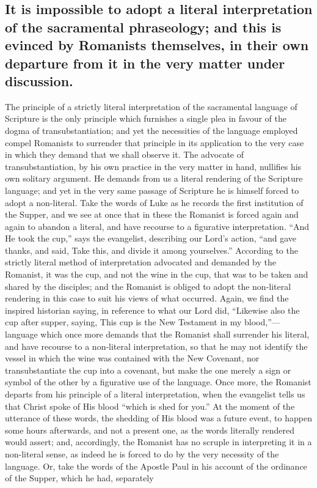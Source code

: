 \documentclass[]{book}
\begin{document}
\hypertarget{it-is-impossible-to-adopt-a-literal-interpretation-of-the-sacramental-phraseology-and-this-is-evinced-by-romanists-themselves-in-their-own-departure-from-it-in-the-very-matter-under-discussion.}{%
\subsection{It is impossible to adopt a literal interpretation of the sacramental phraseology; and this is evinced by Romanists themselves, in their own departure from it in the very matter under discussion.}\label{it-is-impossible-to-adopt-a-literal-interpretation-of-the-sacramental-phraseology-and-this-is-evinced-by-romanists-themselves-in-their-own-departure-from-it-in-the-very-matter-under-discussion.}}

The principle of a strictly literal interpretation of the sacramental language of Scripture is the only principle which furnishes a single plea in favour of the dogma of transubstantiation; and yet the necessities of the language employed compel Romanists to surrender that principle in its application to the very case in which they demand that we shall observe it. The advocate of transubstantiation, by his own practice in the very matter in hand, nullifies his own solitary argument. He demands from us a literal rendering of the Scripture language; and yet in the very same passage of Scripture he is himself forced to adopt a non-literal. Take the words of Luke as he records the first institution of the Supper, and we see at once that in these the Romanist is forced again and again to abandon a literal, and have recourse to a figurative interpretation. ``And He took the cup,'' says the evangelist, describing our Lord's action, ``and gave thanks, and said, Take this, and divide it among yourselves.'' According to the strictly literal method of interpretation advocated and demanded by the Romanist, it was the cup, and not the wine in the cup, that was to be taken and shared by the disciples; and the Romanist is obliged to adopt the non-literal rendering in this case to suit his views of what occurred. Again, we find the inspired historian saying, in reference to what our Lord did, ``Likewise also the cup after supper, saying, This cup is the New Testament in my blood,''---language which once more demands that the Romanist shall surrender his literal, and have recourse to a non-literal interpretation, so that he may not identify the vessel in which the wine was contained with the New Covenant, nor transubstantiate the cup into a covenant, but make the one merely a sign or symbol of the other by a figurative use of the language. Once more, the Romanist departs from his principle of a literal interpretation, when the evangelist tells us that Christ spoke of His blood ``which is shed for you.'' At the moment of the utterance of these words, the shedding of His blood was a future event, to happen some hours afterwards, and not a present one, as the words literally rendered would assert; and, accordingly, the Romanist has no scruple in interpreting it in a non-literal sense, as indeed he is forced to do by the very necessity of the language. Or, take the words of the Apostle Paul in his account of the ordinance of the Supper, which he had, separately 
\end{document}
